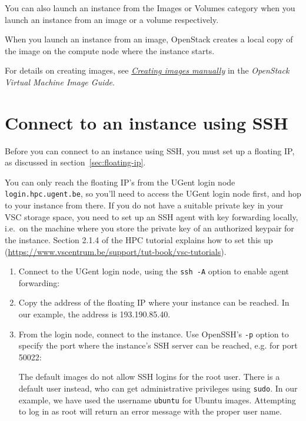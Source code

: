 You can also launch an instance from the Images or Volumes category when
you launch an instance from an image or a volume respectively.

When you launch an instance from an image, OpenStack creates a local
copy of the image on the compute node where the instance starts.

For details on creating images, see
\href{https://docs.openstack.org/image-guide/create-images-manually.html}{\emph{Creating
images manually}} in the \emph{OpenStack Virtual Machine Image Guide}.

\section{Connect to an instance using SSH}\label{connect-to-your-instance-using-ssh}
Before you can connect to an instance using SSH, you must set up a
floating IP, as discussed in section~\ref{sec:floating-ip}.

You can only reach the floating IP's from the UGent login node
\lstinline{login.hpc.ugent.be}, so you'll need to access the UGent
login node first, and hop to your instance from there.  If you do not
have a suitable private key in your VSC storage space, you need to set
up an SSH agent with key forwarding locally, i.e.\ on the machine
where you store the private key of an authorized keypair for the
instance.  Section 2.1.4 of the HPC tutorial explains how to set this
up (\url{https://www.vscentrum.be/support/tut-book/vsc-tutorials}).

\begin{enumerate}
\item Connect to the UGent login node, using the \lstinline{ssh -A} option
  to enable agent forwarding:

  \begin{prompt}
  \end{prompt}

\item Copy the address of the floating IP where your instance can be
  reached.  In our example, the address is 193.190.85.40.

\item From the login node, connect to the instance.  Use OpenSSH's
  \lstinline{-p} option to specify the port where the instance's SSH
  server can be reached, e.g. for port 50022:

  \begin{prompt}
  \end{prompt}

  The default images do not allow SSH logins for the root user.  There
  is a default user instead, who can get administrative privileges
  using \lstinline{sudo}.  In our example, we have used the username
  \lstinline{ubuntu} for Ubuntu images.  Attempting to log in as root
  will return an error message with the proper user name.
\end{enumerate}

